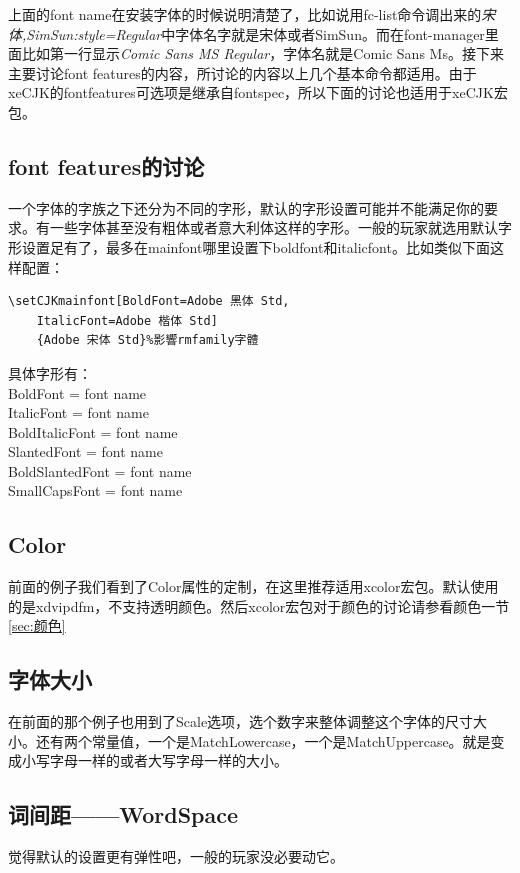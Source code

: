 \documentclass[11pt,oneside]{book}
\begin{document}
上面的font name在安装字体的时候说明清楚了，比如说用fc-list命令调出来的\textit{宋体,SimSun:style=Regular}中字体名字就是宋体或者SimSun。而在font-manager里面比如第一行显示\textit{Comic Sans MS Regular}，字体名就是Comic Sans Ms。接下来主要讨论font features的内容，所讨论的内容以上几个基本命令都适用。由于xeCJK的fontfeatures可选项是继承自fontspec，所以下面的讨论也适用于xeCJK宏包。

\subsection{font features的讨论}
一个字体的字族之下还分为不同的字形，默认的字形设置可能并不能满足你的要求。有一些字体甚至没有粗体或者意大利体这样的字形。一般的玩家就选用默认字形设置足有了，最多在mainfont哪里设置下boldfont和italicfont。比如类似下面这样配置：
\begin{Verbatim}
\setCJKmainfont[BoldFont=Adobe 黑体 Std,
    ItalicFont=Adobe 楷体 Std]
    {Adobe 宋体 Std}%影響rmfamily字體
\end{Verbatim}

具体字形有：\\
BoldFont = font name\\
ItalicFont = font name\\
BoldItalicFont = font name\\
SlantedFont = font name\\
BoldSlantedFont = font name\\
SmallCapsFont = font name



\subsection{Color}
前面的例子我们看到了Color属性的定制，在这里推荐适用xcolor宏包。\XeLaTeX 默认使用的是xdvipdfm，不支持透明颜色。然后xcolor宏包对于颜色的讨论请参看颜色一节\ref{sec:颜色}

\subsection{字体大小}
在前面的那个例子也用到了Scale选项，选个数字来整体调整这个字体的尺寸大小。还有两个常量值，一个是MatchLowercase，一个是MatchUppercase。就是变成小写字母一样的或者大写字母一样的大小。

\subsection{词间距——WordSpace}
觉得默认的设置更有弹性吧，一般的玩家没必要动它。
\end{document}
